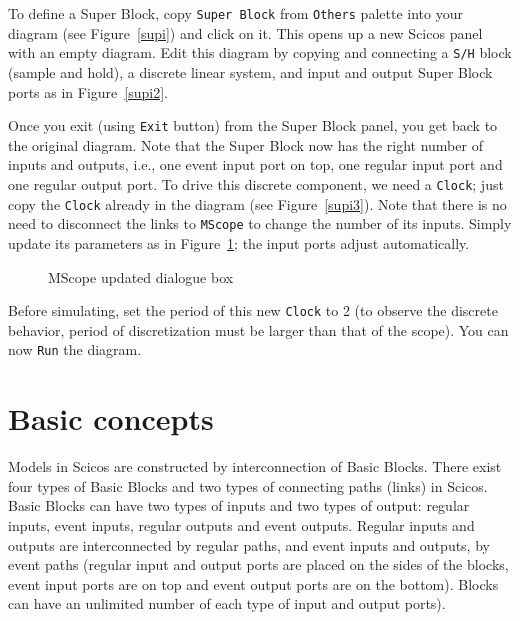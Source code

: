 \documentclass{book}
\begin{document}



To define a Super Block, copy {\tt Super Block} from {\tt Others} palette
into your diagram (see Figure~\ref{supi}) and click on it. This opens up
a new Scicos panel with an empty diagram. Edit this diagram by copying and connecting a 
{\tt S/H} block (sample and hold), a discrete linear system, and
input and output Super Block ports as in Figure~\ref{supi2}.




Once you exit (using {\tt Exit} button) from the Super Block panel, you
get back to the original diagram. Note that the Super Block now has the
right number of inputs and outputs, i.e., one event input port on top,
one regular input port and one regular output port. To drive this discrete
component, we need a {\tt Clock}; just copy the {\tt Clock} already in
the diagram (see Figure~\ref{supi3}). Note that there is no need to
disconnect the links to {\tt MScope} to change the number of its inputs.
Simply update its parameters as in Figure~\ref{supi4}; the input ports adjust
automatically. 





  \begin{figure}[htbp]
  \centerline{}
  \caption{MScope updated dialogue box}
 \label{supi4}
  \end{figure}

Before simulating, set the period of this new {\tt Clock} to 2 (to observe
the discrete behavior, period of discretization must be larger than that of
the scope). You can now {\tt Run} the diagram.


\chapter{Basic concepts}
\label{ssa}
\label{ch4}
Models in Scicos are constructed by interconnection of Basic
Blocks. There exist four types of Basic Blocks and two types of
connecting paths (links) in Scicos. Basic Blocks can have two types of
inputs and two types of output: regular inputs, event inputs, regular
outputs and event outputs. Regular inputs and outputs are
interconnected by regular paths, and event inputs and outputs, by
event paths (regular input and output ports are placed on the sides of
the blocks, event input ports are on top and event output ports are on
the bottom). Blocks can have an unlimited number of each type of input
and output ports).
\end{document}

